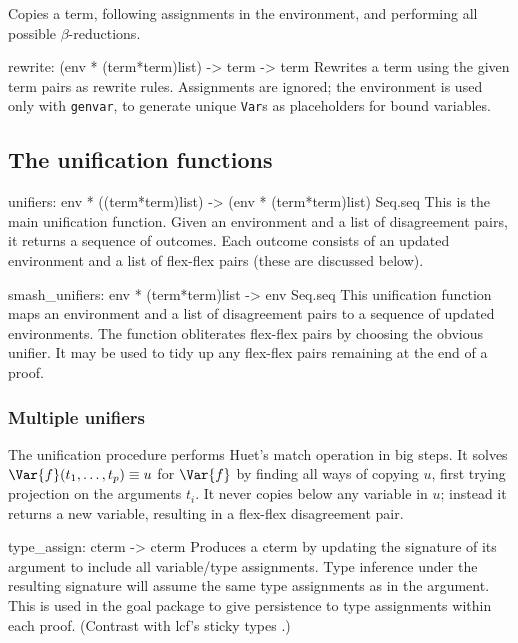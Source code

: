 Copies a term, 
following assignments in the environment,
and performing all possible \(\beta\)-reductions.

\beginprog
rewrite: (env * (term*term)list) -> term -> term
\endprog
Rewrites a term using the given term pairs as rewrite rules.  Assignments
are ignored; the environment is used only with {\tt genvar}, to generate
unique {\tt Var}s as placeholders for bound variables.


\subsection{The unification functions}


\beginprog
unifiers: env * ((term*term)list) -> (env * (term*term)list) Seq.seq
\endprog
This is the main unification function.
Given an environment and a list of disagreement pairs,
it returns a sequence of outcomes.
Each outcome consists of an updated environment and 
a list of flex-flex pairs (these are discussed below).

\beginprog
smash_unifiers: env * (term*term)list -> env Seq.seq
\endprog
This unification function maps an environment and a list of disagreement
pairs to a sequence of updated environments.  The function obliterates
flex-flex pairs by choosing the obvious unifier.  It may be used to tidy up
any flex-flex pairs remaining at the end of a proof.


\subsubsection{Multiple unifiers}
The unification procedure performs Huet's {\sc match} operation
\cite{huet75} in big steps.
It solves \(\Var{f}(t_1,\ldots,t_p) \equiv u\) for \(\Var{f}\) by finding
all ways of copying \(u\), first trying projection on the arguments
\(t_i\).  It never copies below any variable in \(u\); instead it returns a
new variable, resulting in a flex-flex disagreement pair.  


\beginprog
type_assign: cterm -> cterm
\endprog
Produces a cterm by updating the signature of its argument
to include all variable/type assignments.
Type inference under the resulting signature will assume the
same type assignments as in the argument.
This is used in the goal package to give persistence to type assignments
within each proof. 
(Contrast with {\sc lcf}'s sticky types \cite[page 148]{paulson-book}.)



